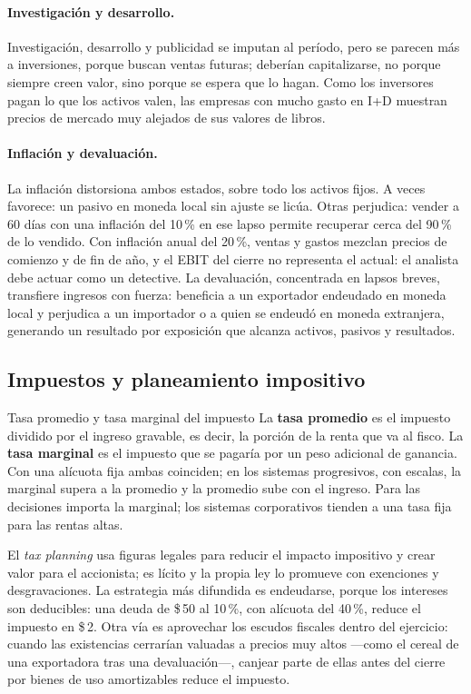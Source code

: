 \paragraph{Investigación y desarrollo.} Investigación, desarrollo y publicidad se imputan al período, pero se parecen más a inversiones, porque buscan ventas futuras; deberían capitalizarse, no porque siempre creen valor, sino porque se espera que lo hagan. Como los inversores pagan lo que los activos valen, las empresas con mucho gasto en I+D muestran precios de mercado muy alejados de sus valores de libros.

\paragraph{Inflación y devaluación.} La inflación distorsiona ambos estados, sobre todo los activos fijos. A veces favorece: un pasivo en moneda local sin ajuste se licúa. Otras perjudica: vender a 60 días con una inflación del 10\,\% en ese lapso permite recuperar cerca del 90\,\% de lo vendido. Con inflación anual del 20\,\%, ventas y gastos mezclan precios de comienzo y de fin de año, y el EBIT del cierre no representa el actual: el analista debe actuar como un detective. La devaluación, concentrada en lapsos breves, transfiere ingresos con fuerza: beneficia a un exportador endeudado en moneda local y perjudica a un importador o a quien se endeudó en moneda extranjera, generando un resultado por exposición que alcanza activos, pasivos y resultados.

\subsection{Impuestos y planeamiento impositivo}

\begin{definicion}{Tasa promedio y tasa marginal del impuesto}
La \textbf{tasa promedio} es el impuesto dividido por el ingreso gravable, es decir, la porción de la renta que va al fisco. La \textbf{tasa marginal} es el impuesto que se pagaría por un peso adicional de ganancia. Con una alícuota fija ambas coinciden; en los sistemas progresivos, con escalas, la marginal supera a la promedio y la promedio sube con el ingreso. Para las decisiones importa la marginal; los sistemas corporativos tienden a una tasa fija para las rentas altas.
\end{definicion}

El \emph{tax planning} usa figuras legales para reducir el impacto impositivo y crear valor para el accionista; es lícito y la propia ley lo promueve con exenciones y desgravaciones. La estrategia más difundida es endeudarse, porque los intereses son deducibles: una deuda de \$\,50 al 10\,\%, con alícuota del 40\,\%, reduce el impuesto en \$\,2. Otra vía es aprovechar los escudos fiscales dentro del ejercicio: cuando las existencias cerrarían valuadas a precios muy altos —como el cereal de una exportadora tras una devaluación—, canjear parte de ellas antes del cierre por bienes de uso amortizables reduce el impuesto.

